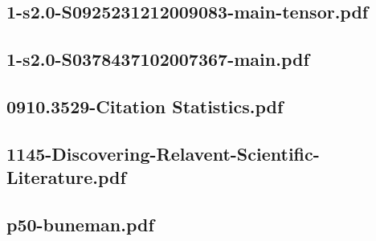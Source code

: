 \documentclass{article}
\begin{document}
\subsection{1-s2.0-S0925231212009083-main-tensor.pdf}

\subsection{1-s2.0-S0378437102007367-main.pdf}

\subsection{0910.3529-Citation Statistics.pdf}

\subsection{1145-Discovering-Relavent-Scientific-Literature.pdf}

\subsection{p50-buneman.pdf}
\end{document}
